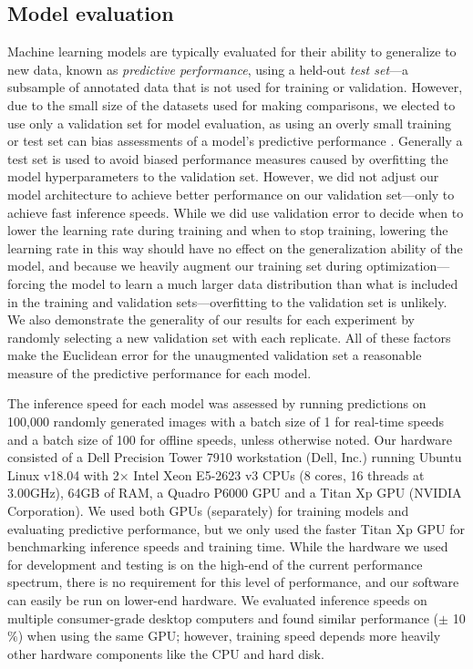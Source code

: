 \documentclass[11pt,a4paper,twoside]{book}
\begin{document}
\begin{doublespace}
\subsection{Model evaluation}
Machine learning models are typically evaluated for their ability to generalize to new data, known as \textit{predictive performance}, using a held-out \textit{test set}—a subsample of annotated data that is not used for training or validation. However, due to the small size of the datasets used for making comparisons, we elected to use only a validation set for model evaluation, as using an overly small training or test set can bias assessments of a model's predictive performance \citep{kuhn2013applied}. Generally a test set is used to avoid biased performance measures caused by overfitting the model hyperparameters to the validation set. However, we did not adjust our model architecture to achieve better performance on our validation set—only to achieve fast inference speeds. While we did use validation error to decide when to lower the learning rate during training and when to stop training, lowering the learning rate in this way should have no effect on the generalization ability of the model, and because we heavily augment our training set during optimization---forcing the model to learn a much larger data distribution than what is included in the training and validation sets—overfitting to the validation set is unlikely. We also demonstrate the generality of our results for each experiment by randomly selecting a new validation set with each replicate. All of these factors make the Euclidean error for the unaugmented validation set a reasonable measure of the predictive performance for each model. 

The inference speed for each model was assessed by running predictions on 100,000 randomly generated images with a batch size of 1 for real-time speeds and a batch size of 100 for offline speeds, unless otherwise noted. Our hardware consisted of a Dell Precision Tower 7910 workstation (Dell, Inc.) running Ubuntu Linux v18.04 with 2$\times$ Intel Xeon E5-2623 v3 CPUs (8 cores, 16 threads at 3.00GHz), 64GB of RAM, a Quadro P6000 GPU and a Titan Xp GPU (NVIDIA Corporation). We used both GPUs (separately) for training models and evaluating predictive performance, but we only used the faster Titan Xp GPU for benchmarking inference speeds and training time. While the hardware we used for development and testing is on the high-end of the current performance spectrum, there is no requirement for this level of performance, and our software can easily be run on lower-end hardware. We evaluated inference speeds on multiple consumer-grade desktop computers and found similar performance ($
\pm$ 10$\%$) when using the same GPU; however, training speed depends more heavily other hardware components like the CPU and hard disk. 


\end{doublespace}
\end{document}
